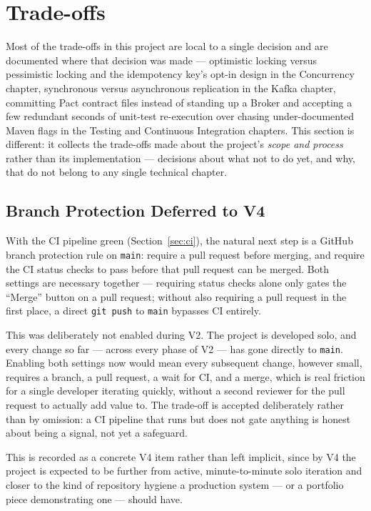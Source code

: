 \section{Trade-offs}
\label{sec:tradeoffs}

Most of the trade-offs in this project are local to a single decision and are documented where that decision was made --- optimistic locking versus pessimistic locking and the idempotency key's opt-in design in the Concurrency chapter, synchronous versus asynchronous replication in the Kafka chapter, committing Pact contract files instead of standing up a Broker and accepting a few redundant seconds of unit-test re-execution over chasing under-documented Maven flags in the Testing and Continuous Integration chapters. This section is different: it collects the trade-offs made about the project's \emph{scope and process} rather than its implementation --- decisions about what not to do yet, and why, that do not belong to any single technical chapter.

\subsection{Branch Protection Deferred to V4}

With the CI pipeline green (Section~\ref{sec:ci}), the natural next step is a GitHub branch protection rule on \texttt{main}: require a pull request before merging, and require the CI status checks to pass before that pull request can be merged. Both settings are necessary together --- requiring status checks alone only gates the ``Merge'' button on a pull request; without also requiring a pull request in the first place, a direct \texttt{git push} to \texttt{main} bypasses CI entirely.

This was deliberately not enabled during V2. The project is developed solo, and every change so far --- across every phase of V2 --- has gone directly to \texttt{main}. Enabling both settings now would mean every subsequent change, however small, requires a branch, a pull request, a wait for CI, and a merge, which is real friction for a single developer iterating quickly, without a second reviewer for the pull request to actually add value to. The trade-off is accepted deliberately rather than by omission: a CI pipeline that runs but does not gate anything is honest about being a signal, not yet a safeguard.

This is recorded as a concrete V4 item rather than left implicit, since by V4 the project is expected to be further from active, minute-to-minute solo iteration and closer to the kind of repository hygiene a production system --- or a portfolio piece demonstrating one --- should have.

